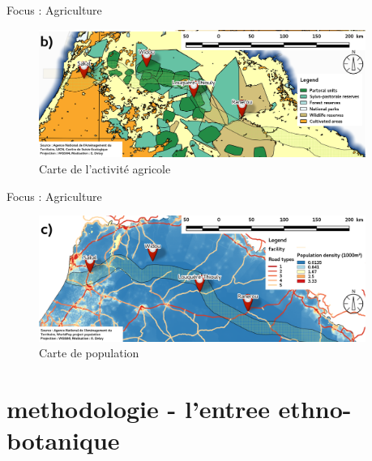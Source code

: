 \documentclass[newPxFont]{beamer}
\begin{document}
\begin{frame}[c]{Focus : Agriculture}

\begin{figure}
	\centering
	\includegraphics[width = 0.95\textwidth]{img/map_agriculture.png}
  \caption{Carte de l'activité agricole}
\end{figure}
\end{frame}

\begin{frame}[c]{Focus : Agriculture}

\begin{figure}
	\centering
	\includegraphics[width = 0.95\textwidth]{img/map_population.png}
  \caption{Carte de population}
\end{figure}
\end{frame}



\section{methodologie - l'entree ethno-botanique}
\end{document}
